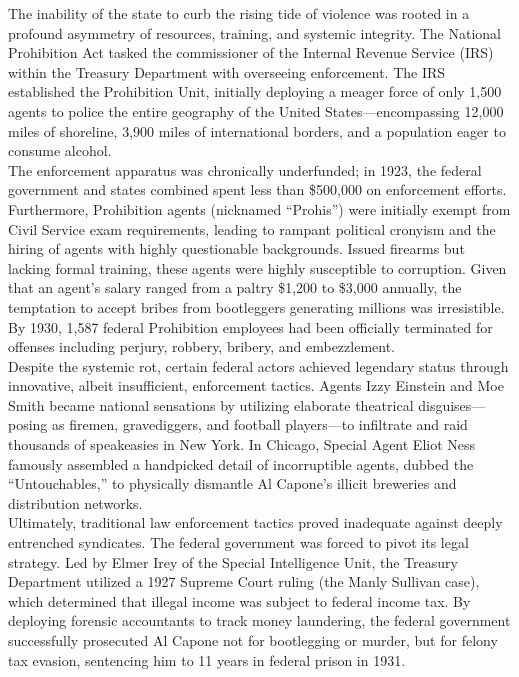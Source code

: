 \documentclass[
]{article}
\begin{document}
The inability of the state to curb the rising tide of violence was
rooted in a profound asymmetry of resources, training, and systemic
integrity. The National Prohibition Act tasked the commissioner of the
Internal Revenue Service (IRS) within the Treasury Department with
overseeing enforcement. The IRS established the Prohibition Unit,
initially deploying a meager force of only 1,500 agents to police the
entire geography of the United States---encompassing 12,000 miles of
shoreline, 3,900 miles of international borders, and a population eager
to consume alcohol.\\
The enforcement apparatus was chronically underfunded; in 1923, the
federal government and states combined spent less than \$500,000 on
enforcement efforts. Furthermore, Prohibition agents (nicknamed
``Prohis'') were initially exempt from Civil Service exam requirements,
leading to rampant political cronyism and the hiring of agents with
highly questionable backgrounds. Issued firearms but lacking formal
training, these agents were highly susceptible to corruption. Given that
an agent's salary ranged from a paltry \$1,200 to \$3,000 annually, the
temptation to accept bribes from bootleggers generating millions was
irresistible. By 1930, 1,587 federal Prohibition employees had been
officially terminated for offenses including perjury, robbery, bribery,
and embezzlement.\\
Despite the systemic rot, certain federal actors achieved legendary
status through innovative, albeit insufficient, enforcement tactics.
Agents Izzy Einstein and Moe Smith became national sensations by
utilizing elaborate theatrical disguises---posing as firemen,
gravediggers, and football players---to infiltrate and raid thousands of
speakeasies in New York. In Chicago, Special Agent Eliot Ness famously
assembled a handpicked detail of incorruptible agents, dubbed the
``Untouchables,'' to physically dismantle Al Capone's illicit breweries
and distribution networks.\\
Ultimately, traditional law enforcement tactics proved inadequate
against deeply entrenched syndicates. The federal government was forced
to pivot its legal strategy. Led by Elmer Irey of the Special
Intelligence Unit, the Treasury Department utilized a 1927 Supreme Court
ruling (the Manly Sullivan case), which determined that illegal income
was subject to federal income tax. By deploying forensic accountants to
track money laundering, the federal government successfully prosecuted
Al Capone not for bootlegging or murder, but for felony tax evasion,
sentencing him to 11 years in federal prison in 1931.
\end{document}
